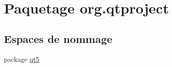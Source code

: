 \hypertarget{namespaceorg_1_1qtproject}{\section{Paquetage org.\-qtproject}
\label{namespaceorg_1_1qtproject}
}
\subsection*{Espaces de nommage}
\begin{DoxyCompactItemize}
\item 
package \hyperlink{namespaceorg_1_1qtproject_1_1qt5}{qt5}
\end{DoxyCompactItemize}
